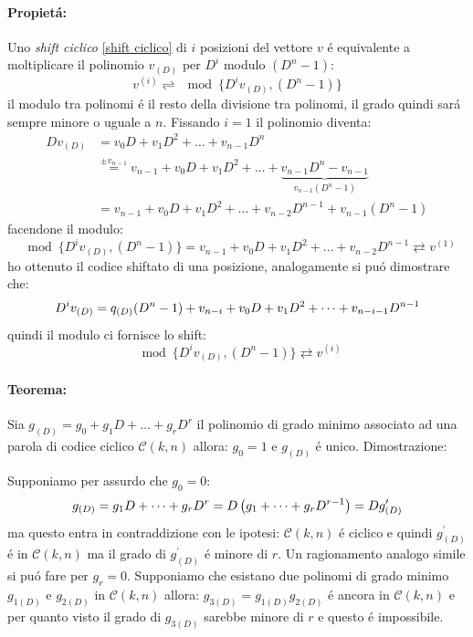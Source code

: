             \paragraph{Propietá:} Uno \emph{shift ciclico} \ref{shift ciclico} di $i$ posizioni del vettore $v$ é equivalente a moltiplicare
            il polinomio $v_{(D)}$ per $D^i$ modulo $(D^n-1)$:
            \[
                v^{(i)} \rightleftharpoons \mod\{D^iv_{(D)},(D^n-1)\}    
            \]
            il modulo tra polinomi é il resto della divisione tra polinomi, il grado quindi sará sempre minore o uguale a $n$. Fissando 
            $i=1$ il polinomio diventa:
            \begin{align}
                Dv_{(D)} &= v_0D+v_1D^2+ \dots +v_{n-1}D^n \nonumber \\
                         &\overset{\pm v_{n-1}}{=} v_{n-1}+v_0D+v_1D^2+ \dots +\underset{v_{n-1}(D^n-1)}{\underbrace{v_{n-1}D^n - v_{n-1}}}\nonumber \\
                         &= v_{n-1}+v_0D+v_1D^2+ \dots + v_{n-2}D^{n-1}+v_{n-1}(D^n-1)\nonumber 
            \end{align}        
            facendone il modulo:
            \[
                \mod\{D^iv_{(D)},(D^n-1)\}=v_{n-1}+v_0D+v_1D^2+ \dots + v_{n-2}D^{n-1} \rightleftarrows v^{(1)}
            \]
            ho ottenuto il codice shiftato di una posizione, analogamente si puó dimostrare che:
            \[
                D^iv_{(D)} = q_{(D)}(D^n-1) +v_{n-i}+v_0D+v_1D^2+ \dots +v_{n-i-1}D^{n-1}\nonumber \\
            \]
            quindi il modulo ci fornisce lo shift:
            \[
                \mod\{D^iv_{(D)},(D^n-1)\} \rightleftarrows v^{(i)}
            \]
            \paragraph{Teorema:} 
                \begin{sloppypar}
                    Sia ${g_{(D)} = g_0+ g_1D+ \dots + g_rD^r}$ il polinomio di grado minimo associato ad una parola di codice ciclico ${\mathcal{C}(k,n)}$ allora:
                    $g_0 =1$ e $g_{(D)}$ é unico. Dimostrazione:
                \end{sloppypar}
                Supponiamo per assurdo che $g_0 =0$:
                \[
                    g_{(D)} = g_1D+ \dots + g_rD^r = D\left(g_1+ \dots + g_rD^{r-1} \right) = Dg^\prime_{(D)}\nonumber \\
                \]
                ma questo entra in contraddizione con le ipotesi: $\mathcal{C}(k,n)$ é ciclico e quindi $g^\prime_(D)$ é 
                in $\mathcal{C}(k,n)$ ma il grado di $g^\prime_{(D)}$ é minore di $r$. Un ragionamento analogo simile si puó fare per 
                $g_r =0$. Supponiamo che esistano due polinomi di grado minimo $g_{1(D)}$ e $g_{2(D)}$ in  $\mathcal{C}(k,n)$ allora:
                $g_{3(D)} = g_{1(D)}g_{2(D)}$ é ancora in $\mathcal{C}(k,n)$ e per quanto visto il grado di $g_{3(D)}$ sarebbe minore di $r$
                e questo é impossibile.
